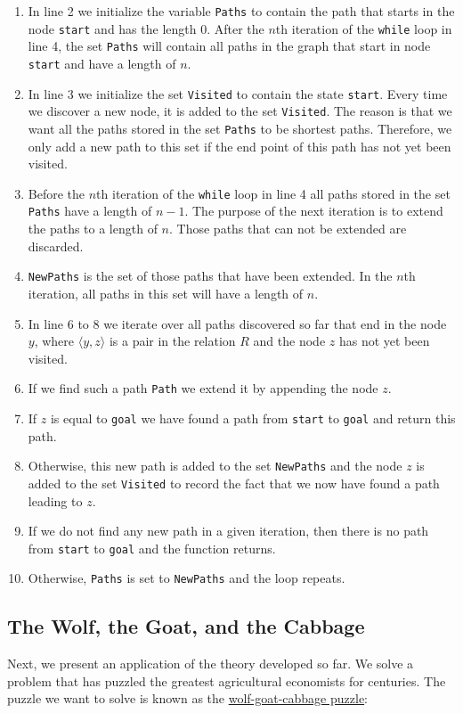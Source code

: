 \begin{enumerate}
\item In line 2 we initialize the variable \texttt{Paths} to contain the path that starts in the node
      \texttt{start} and has the length $0$.  After the $n$th iteration of the \texttt{while} loop in line 4,
      the set \texttt{Paths} will contain all paths in the graph that start in node \texttt{start} and have a
      length of $n$.
\item In line 3 we initialize the set \texttt{Visited} to contain the state \texttt{start}.
      Every time we discover a new node, it is added to the set \texttt{Visited}.
      The reason is that we want all the paths stored in the set \texttt{Paths} to be shortest paths.
      Therefore, we only add a new path to this set if the end point of this path has not yet been visited.
\item Before the $n$th iteration of the \texttt{while} loop in line 4 all paths stored in
      the set \texttt{Paths} have a length of $n-1$.  The purpose of the next iteration is to extend the paths to
      a length of $n$.  Those paths that can not be extended are discarded.     
\item \texttt{NewPaths} is the set of those paths that have been extended.  In the $n$th iteration,
      all paths in this set will have a length of $n$.
\item In line 6 to 8 we iterate over all paths discovered so far that end in the node $y$, where $\langle y, z\rangle$
      is a pair in the relation $R$ and the node $z$ has not yet been visited.
\item If we find such a path \texttt{Path} we extend it by appending the node $z$.
\item If $z$ is equal to \texttt{goal} we have found a path from \texttt{start} to \texttt{goal} and return
      this path.
\item Otherwise, this new path is added to the set \texttt{NewPaths} and the node $z$ is added to the set
      \texttt{Visited} to record the fact that we now have found a path leading to $z$.
\item If we do not find any new path in a given iteration, then there is no path from \texttt{start} to
      \texttt{goal} and the function returns.
\item Otherwise, \texttt{Paths} is set to \texttt{NewPaths} and the loop repeats.
\end{enumerate}


\subsection{The Wolf, the Goat, and the Cabbage}
Next, we present an application of the theory developed so far.  We solve a problem that has puzzled
the greatest agricultural economists for centuries.  The puzzle we want to solve is known as the 
\href{http://jeux.lulu.pagesperso-orange.fr/html/anglais/loupChe/loupChe1.htm}{wolf-goat-cabbage puzzle}:  
\vspace*{0.3cm}

